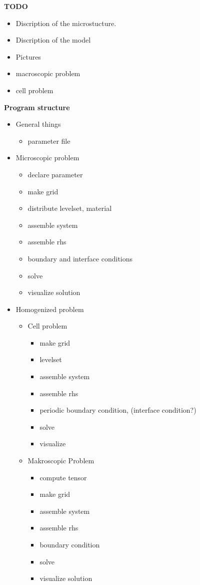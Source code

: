 \documentclass[10pt, a4paper]{article}
\begin{document}
\textbf{TODO}
\begin{itemize}
\item Discription of the microstucture.
\item Discription of the model
\item Pictures
\item macroscopic problem
\item cell problem

\end{itemize}


\textbf{Program structure}
\begin{itemize}
\item General things
\begin{itemize}
\item parameter file
\end{itemize}

\item Microscopic problem
\begin{itemize}
\item declare parameter
\item make grid
\item distribute levelset, material
\item assemble system
\item assemble rhs
\item boundary and interface conditions
\item solve
\item visualize solution
\end{itemize}

\item Homogenized problem
\begin{itemize}
\item Cell problem
\begin{itemize}
\item make grid 
\item levelset
\item assemble system
\item assemble rhs
\item periodic boundary condition, (interface condition?)
\item solve
\item visualize
\end{itemize}
\item Makroscopic Problem
\begin{itemize}
\item compute tensor
\item make grid
\item assemble system
\item assemble rhs
\item boundary condition
\item solve
\item visualize solution
\end{itemize}
\end{itemize}
\end{itemize}
\end{document}
